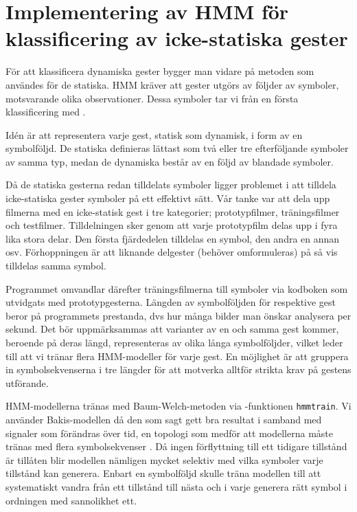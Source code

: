 \documentclass[../rapport_MVEX01-11-05]{subfiles}
\begin{document}
\section{Implementering av HMM för klassificering av icke-statiska gester}

För att klassificera dynamiska gester bygger man vidare på metoden som användes
för de statiska.  HMM kräver att gester utgörs av följder av symboler,
motsvarande olika observationer. Dessa symboler tar vi från en första
klassificering med \knn.

Idén är att representera varje gest, statisk som dynamisk, i form av en
symbolföljd.  De statiska definieras lättast som två eller tre efterföljande
symboler av samma typ, medan de dynamiska består av en följd av blandade
symboler.

Då de statiska gesterna redan tilldelats
symboler ligger problemet i att tilldela icke-statiska gester symboler på ett effektivt sätt. Vår tanke
var att dela upp filmerna med en icke-statisk gest i tre kategorier; prototypfilmer, träningsfilmer och 
testfilmer. Tilldelningen sker genom att varje prototypfilm delas upp i fyra lika stora delar. Den 
första fjärdedelen tilldelas en symbol, den andra en annan osv. Förhoppningen är att liknande 
delgester (behöver omformuleras) på så vis tilldelas samma symbol. 

Programmet omvandlar därefter träningsfilmerna till symboler via kodboken som utvidgats 
med prototypgesterna. Längden av 
symbolföljden för respektive gest beror på programmets prestanda, dvs hur många bilder 
man önskar analysera per sekund. Det bör uppmärksammas att varianter av en och samma gest 
kommer, beroende på deras längd, representeras av olika långa symbolföljder, vilket leder till 
att vi tränar flera HMM-modeller för varje gest. En möjlighet är att gruppera in symbolsekvenserna 
i tre längder för att motverka alltför strikta krav på gestens utförande. 

HMM-modellerna tränas med Baum-Welch-metoden via \MATLAB-funktionen \texttt{hmmtrain}. Vi använder Bakis-modellen 
då den som sagt gett bra resultat i samband med signaler som förändras över tid, en topologi som medför att
modellerna måste tränas med flera symbolsekvenser \cite{Rabiner89}. Då ingen förflyttning till ett tidigare
tillstånd är tillåten blir modellen nämligen mycket selektiv med vilka symboler varje tillstånd kan generera. 
Enbart en symbolföljd skulle träna modellen till att systematiskt vandra från ett tillstånd till nästa och i 
varje generera rätt symbol i ordningen med sannolikhet ett. 
\end{document}
